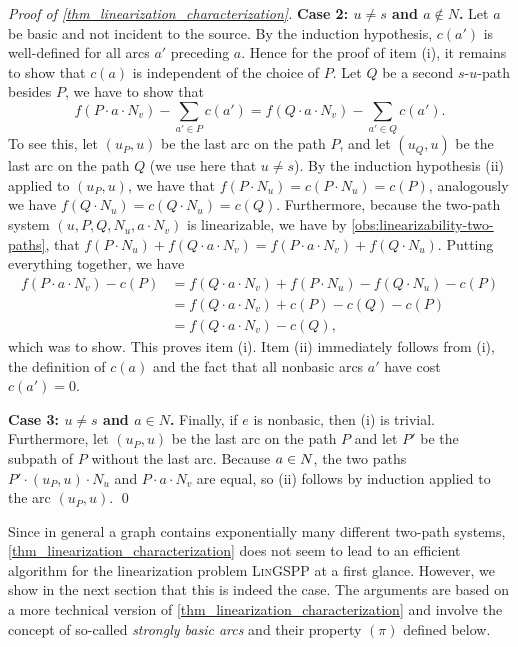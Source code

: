\begin{proof}[Proof of \cref{thm_linearization_characterization}]
    \textbf{Case 2: $u \neq s$ and $a \not\in N$.} Let $a$ be basic and not incident to the source. By the induction hypothesis, $c(a')$ is well-defined for all arcs $a'$ preceding $a$. Hence for the proof of item (i), it remains to show that $c(a)$ is independent of the choice of $P$. Let $Q$ be a second $s$-$u$-path besides $P$, we have to show that 
    \[
    f(P \cdot a \cdot N_v) - \sum_{a' \in P}c(a') = f(Q \cdot a \cdot N_v) - \sum_{a' \in Q}c(a').
    \]
    To see this, let $(u_P, u)$ be the last arc on the path $P$, and let $(u_Q, u)$ be the last arc on the path $Q$ (we use here that $u \neq s$). By the induction hypothesis (ii) applied to $(u_P, u)$, we have that $f(P \cdot N_u) = c(P \cdot N_u) = c(P)$, analogously we have $f(Q \cdot N_u) = c(Q \cdot N_u) = c(Q)$. Furthermore, because the two-path system $(u, P, Q, N_u, a \cdot N_v)$ is linearizable, we have by \cref{obs:linearizability-two-paths}, that $f(P \cdot N_u) + f(Q \cdot a \cdot N_v) = f(P \cdot a \cdot N_v) + f(Q \cdot N_u)$. Putting everything together, we have
    \begin{align*}
         f(P \cdot a \cdot N_v) - c(P) &= f(Q \cdot a \cdot N_v) + f(P \cdot N_u) - f(Q \cdot N_u) - c(P)\\
         &= f(Q \cdot a \cdot N_v) + c(P) - c(Q) - c(P)\\
         &= f(Q \cdot a \cdot N_v) - c(Q),
    \end{align*}
    which was to show. This proves item (i). Item (ii) immediately follows from (i), the definition of $c(a)$ and the fact that all nonbasic arcs $a'$ have cost $c(a') = 0$.
    
    \textbf{Case 3: $u \neq s$ and $a \in N$.} Finally, if $e$ is nonbasic, then (i) is trivial. Furthermore, let $(u_P, u)$ be the last arc on the path $P$ and let $P'$ be the subpath of $P$ without the last arc. Because $a \in N$, the two paths $P' \cdot (u_P, u) \cdot N_u$ and $P \cdot a \cdot N_v$ are equal, so (ii) follows by induction applied to the arc $(u_P, u)$.
    \qed
\end{proof}

Since in general a graph contains exponentially many different two-path systems,   \cref{thm_linearization_characterization} does not seem to lead to  an  efficient algorithm for  the linearization problem \textsc{Lin}GSPP at a first glance. However, we show in the next section that this is indeed the case. The arguments  are based on a more technical version of \cref{thm_linearization_characterization} and involve the concept of  so-called \emph{strongly basic arcs} and their property $(\pi)$ defined below.


